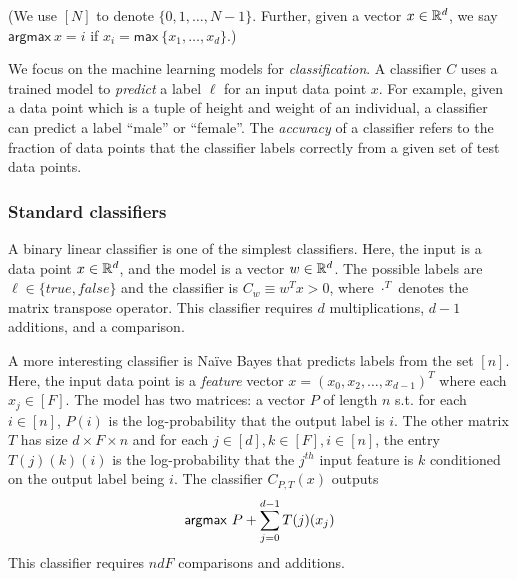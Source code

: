 \noindent(We use $[N]$ to denote $\{0,1,\dotsc, N-1\}$. 
Further, given a vector $x\in{\mathbb{R}}^d$, we say $\mathsf{argmax}\ x = i$ if
$x_i = \mathsf{max}\ \{x_1,\ldots,x_d\}$.)

We focus on the machine learning models for {\it classification}.
A classifier $C$ uses a trained model to {\it predict} a
label $\ell$ for an input data point $x$. For example, given a
data point which is a tuple of height and weight of an individual,
a classifier can predict a label ``male'' or ``female''. The {\it
  accuracy} of a classifier refers to the fraction of data points that
the classifier labels correctly from a given set of test data
points.

\subsubsection*{Standard classifiers}
A binary linear classifier is one of the simplest classifiers. Here,
the input is a data point $x\in{\mathbb{R}}^d$,
and the model is a vector $w\in{\mathbb{R}}^d$. The possible labels are
$\ell\in\{\mathit{true},\mathit{false}\}$ and the classifier is
$C_w\equiv w^Tx>0$, where $\cdot^T$ denotes the matrix transpose
operator. This classifier requires $d$ multiplications, $d-1$
additions, and a comparison.

A more interesting classifier is Na\"{i}ve Bayes that predicts labels
from the set $[n]$.
Here, the input data point is a {\it feature}
vector $x=(x_0,x_2,\ldots,x_{d-1})^T$ where each $x_j\in [F]$.
The model has two matrices: a vector $P$ of length $n$ s.t. for each
$i
\in [n]$, $P(i)$ is the log-probability that the output label is $i$.
The other matrix $T$ has size $d\times F\times n$ and for each $j\in
[d], k\in [F], i\in [n]$, the entry $T(j)(k)(i)$ is 
the log-probability that  the $j^{th}$ input feature is $k$  conditioned on  the output label being $i$.
The classifier $C_{P,T}(x)$ outputs
\[
{\sf argmax}\ P+\sum_{j=0}^{d-1} T(j)(x_j)
\]
This classifier requires $ndF$ comparisons and additions.  

